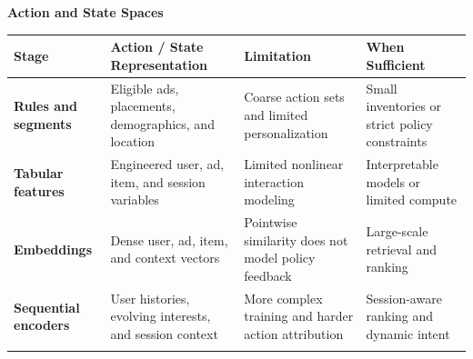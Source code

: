 \documentclass[manuscript,review,screen]{acmart}
\begin{document}
\begin{table}[ht]
\textbf{Action and State Spaces}\\[0.3em]
\begin{tabularx}{\textwidth}{>{\raggedright\arraybackslash}p{} >{\raggedright\arraybackslash}p{} >{\raggedright\arraybackslash}p{} >{\raggedright\arraybackslash}p{}}
\toprule
\textbf{Stage} & \textbf{Action / State Representation} & \textbf{Limitation} & \textbf{When Sufficient} \\
\midrule
\textbf{Rules and segments} & Eligible ads, placements, demographics, and location & Coarse action sets and limited personalization & Small inventories or strict policy constraints \\
\textbf{Tabular features} & Engineered user, ad, item, and session variables & Limited nonlinear interaction modeling & Interpretable models or limited compute \\
\textbf{Embeddings} & Dense user, ad, item, and context vectors & Pointwise similarity does not model policy feedback & Large-scale retrieval and ranking \\
\textbf{Sequential encoders} & User histories, evolving interests, and session context & More complex training and harder action attribution & Session-aware ranking and dynamic intent \\
\midrule
\multicolumn{4}{>{\raggedright\arraybackslash}p{0.94\textwidth}}{\emph{Representative sources:} \cite{covington2016deep, cheng2016wide, vorotilov2023scaling, Zhou2019}.} \\
\bottomrule
\end{tabularx}

\vspace{1em}


\end{table}
\end{document}
